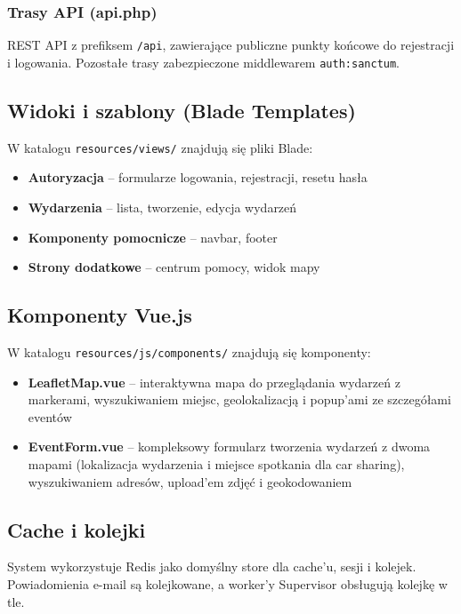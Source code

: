 \documentclass[12pt,a4paper]{article}
\begin{document}
\subsubsection{Trasy API (api.php)}
REST API z prefiksem \texttt{/api}, zawierające publiczne punkty końcowe do rejestracji i logowania. Pozostałe trasy zabezpieczone middlewarem \texttt{auth:sanctum}.

\subsection{Widoki i szablony (Blade Templates)}

W katalogu \texttt{resources/views/} znajdują się pliki Blade:

\begin{itemize}[itemsep=2pt]
    \item \textbf{Autoryzacja} -- formularze logowania, rejestracji, resetu hasła
    \item \textbf{Wydarzenia} -- lista, tworzenie, edycja wydarzeń
    \item \textbf{Komponenty pomocnicze} -- navbar, footer
    \item \textbf{Strony dodatkowe} -- centrum pomocy, widok mapy
\end{itemize}

\subsection{Komponenty Vue.js}

W katalogu \texttt{resources/js/components/} znajdują się komponenty:

\begin{itemize}[itemsep=2pt]
    \item \textbf{LeafletMap.vue} -- interaktywna mapa do przeglądania wydarzeń z markerami, wyszukiwaniem miejsc, geolokalizacją i popup'ami ze szczegółami eventów
    \item \textbf{EventForm.vue} -- kompleksowy formularz tworzenia wydarzeń z dwoma mapami (lokalizacja wydarzenia i miejsce spotkania dla car sharing), wyszukiwaniem adresów, upload'em zdjęć i geokodowaniem
\end{itemize}

\subsection{Cache i kolejki}

System wykorzystuje Redis jako domyślny store dla cache'u, sesji i kolejek. Powiadomienia e-mail są kolejkowane, a worker'y Supervisor obsługują kolejkę w tle.
\end{document}
